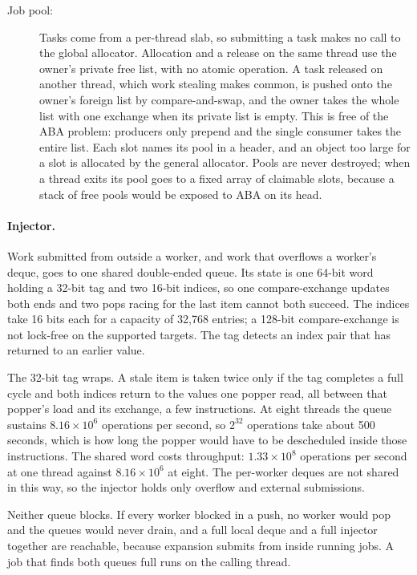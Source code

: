 \documentclass[9pt,twocolumn,a4paper]{extarticle}
\begin{document}
\begin{description}
\item[Job pool:] Tasks come from a per-thread slab, so submitting a task makes no call to the global
allocator. Allocation and a release on the same thread use the owner's private free list, with no
atomic operation. A task released on another thread, which work stealing makes common, is pushed
onto the owner's foreign list by compare-and-swap, and the owner takes the whole list with one
exchange when its private list is empty. This is free of the ABA problem: producers only prepend
and the single consumer takes the entire list. Each slot names its pool in a header, and an object
too large for a slot is allocated by the general allocator. Pools are never destroyed; when a
thread exits its pool goes to a fixed array of claimable slots, because a stack of free pools would
be exposed to ABA on its head.
\end{description}

\paragraph{Injector.}
Work submitted from outside a worker, and work that overflows a worker's deque, goes to one shared
double-ended queue. Its state is one 64-bit word holding a 32-bit tag and two 16-bit indices, so
one compare-exchange updates both ends and two pops racing for the last item cannot both succeed.
The indices take 16 bits each for a capacity of 32{,}768 entries; a 128-bit compare-exchange is not
lock-free on the supported targets. The tag detects an index pair that has returned to an earlier
value.

The 32-bit tag wraps. A stale item is taken twice only if the tag completes a full cycle and both
indices return to the values one popper read, all between that popper's load and its exchange, a
few instructions. At eight threads the queue sustains $8.16 \times 10^6$ operations per second, so
$2^{32}$ operations take about 500 seconds, which is how long the popper would have to be
descheduled inside those instructions. The shared word costs throughput: $1.33 \times 10^8$
operations per second at one thread against $8.16 \times 10^6$ at eight. The per-worker deques
are not shared in this way, so the injector holds only overflow and external submissions.

Neither queue blocks. If every worker blocked in a push, no worker would pop and the queues would
never drain, and a full local deque and a full injector together are reachable, because expansion
submits from inside running jobs. A job that finds both queues full runs on the calling thread.
\end{document}
